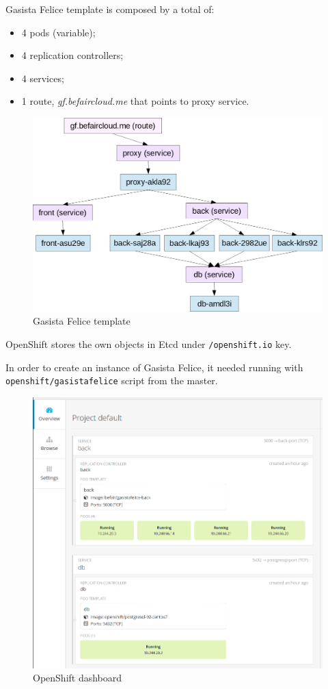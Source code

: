 Gasista Felice template is composed by a total of:

\begin{itemize}
\item 4 pods (variable);
\item 4 replication controllers;
\item 4 services;
\item 1 route, \textit{gf.befaircloud.me} that points to proxy service.
\end{itemize}

\begin{figure}[htbp]
\centering
\includegraphics{media/ch5-template-gf.png}
\caption{Gasista Felice template}
\end{figure}

OpenShift stores the own objects in Etcd under \texttt{/openshift.io} key.

In order to create an instance of Gasista Felice, it needed running with \texttt{openshift/gasistafelice} script from the master.

\begin{figure}[htbp]
\centering
\includegraphics{media/ch5-openshift.png}
\caption{OpenShift dashboard}
\end{figure}

